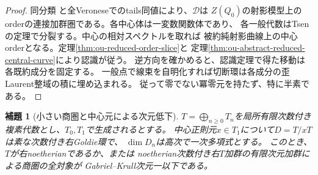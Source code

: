 \documentclass[11pt,a4paper]{ltjsarticle}
\newtheorem{lemma}[theorem]{補題}
\theoremstyle{definition}
\begin{document}
\begin{proof}
同分類\cite{ASsemiprime2000}\cite[Corollary~6.4(i), Theorems~6.5, 6.6(i)]{StaffordVdB2001}
と全Veroneseでのtails同値により、$\mathcal D$は
$Z(Q_0)$の射影模型上のorderの連接加群圏である。各中心体は一変数関数体であり、
各一般代数はTsenの定理で分裂する。中心の相対スペクトルを取れば
被約純射影曲線上の中心orderとなる。定理\ref{thm:ou-reduced-order-slice}と
定理\ref{thm:ou-abstract-reduced-central-curve}により認識が従う。
逆方向を確かめると、認識定理で得た移動は各既約成分を固定する。
一般点で線束を自明化すれば切断環は各成分の歪Laurent整域の積に埋め込まれる。
従って零でない冪零元を持たず、特に半素である。
\end{proof}

\begin{lemma}[小さい商圏と中心元による次元低下]
\label{lem:ou-small-goldie-dimension}
$T=\bigoplus_{n\ge0}T_n$を局所有限次数付き複素代数とし、$T_0,T_1$で生成されるとする。
中心正則元$x\in T_1$について$D=T/xT$は素な次数付き右Goldie環で、
$\dim D_n$は高次で一次多項式とする。
このとき、$T$が右noetherianであるか、または
noetherian次数付き右$T$加群の有限次元加群による商圏の全対象が
Gabriel--Krull次元一以下である。
\end{lemma}
\end{document}
